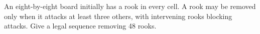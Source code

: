 An eight-by-eight board initially has a rook in every cell. A rook may be removed only when it attacks at least three others, with intervening rooks blocking attacks. Give a legal sequence removing 48 rooks.
